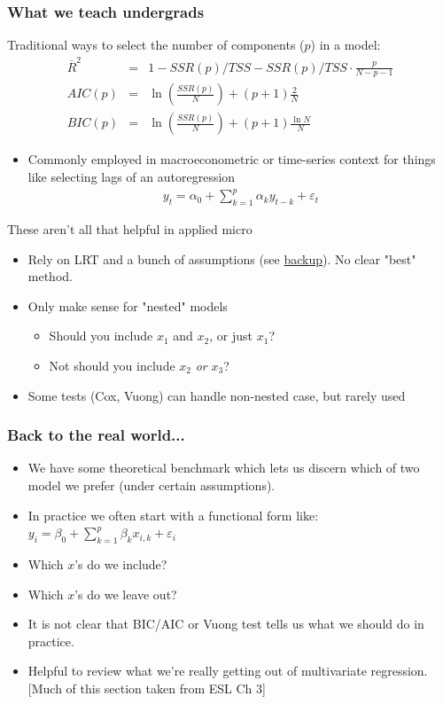 \begin{frame}
\frametitle{What we teach undergrads}
Traditional ways to select the number of components ($p$) in a model:\\
\begin{eqnarray*}
\overline{R}^2  &=& 1-SSR(p)/TSS - SSR(p)/TSS \cdot \frac{p}{N-p-1} \\
AIC(p) &=& \ln\left(\frac{SSR(p)}{N}\right) + (p+1)\frac{2}{N}\\
BIC(p) &=& \ln \left(\frac{SSR(p)}{N} \right) + (p+1)\frac{\ln N}{N}
\end{eqnarray*}
\begin{itemize}
\item Commonly employed in macroeconometric or time-series context for things like selecting lags of an autoregression
\begin{eqnarray*}
y_t = \alpha_0 + \sum_{k=1}^p \alpha_k y_{t-k} + \varepsilon_t
\end{eqnarray*}
\end{itemize}
\end{frame}

\begin{frame}{These aren't all that helpful in applied micro}
    \begin{itemize}
        \item Rely on LRT and a bunch of assumptions (see \hyperlink{sec:info}{backup}). No clear "best" method.
        \item Only make sense for "nested" models
        \begin{itemize}
            \item Should you include $x_1$ and $x_2$, or just $x_1$?
            \item Not should you include $x_2$ \textit{or} $x_3$?
        \end{itemize}
        \item Some tests (Cox, Vuong) can handle non-nested case, but rarely used
    \end{itemize}
\end{frame}

\begin{frame}
\frametitle{Back to the real world...}
\begin{itemize}
\item We have some theoretical benchmark which lets us discern which of two model we prefer (under certain assumptions).
\item In practice we often start with a functional form like:\\
 $y_i = \beta_0 + \sum_{k=1}^p \beta_k x_{i,k} + \varepsilon_{i}$
 \item Which $x$'s do we include?
 \item Which $x$'s do we leave out?
 \item It is not clear that BIC/AIC or Vuong test tells us what we should do in practice.
 \item Helpful to review what we're really getting out of multivariate regression. [Much of this section taken from ESL Ch 3]
\end{itemize}
\end{frame}


